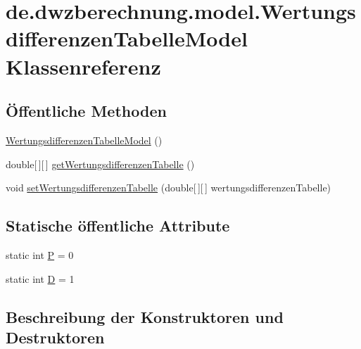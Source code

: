\hypertarget{classde_1_1dwzberechnung_1_1model_1_1_wertungsdifferenzen_tabelle_model}{}\section{de.\+dwzberechnung.\+model.\+Wertungsdifferenzen\+Tabelle\+Model Klassenreferenz}
\label{classde_1_1dwzberechnung_1_1model_1_1_wertungsdifferenzen_tabelle_model}
\subsection*{Öffentliche Methoden}
\begin{DoxyCompactItemize}
\item 
\hyperlink{classde_1_1dwzberechnung_1_1model_1_1_wertungsdifferenzen_tabelle_model_aaf102d0c950e40b46a0bf01a78148ccd}{Wertungsdifferenzen\+Tabelle\+Model} ()
\item 
double\mbox{[}$\,$\mbox{]}\mbox{[}$\,$\mbox{]} \hyperlink{classde_1_1dwzberechnung_1_1model_1_1_wertungsdifferenzen_tabelle_model_ad5c004849bc9221069bdee0840bcfc88}{get\+Wertungsdifferenzen\+Tabelle} ()
\item 
void \hyperlink{classde_1_1dwzberechnung_1_1model_1_1_wertungsdifferenzen_tabelle_model_ae74c99c5097c7b78553ca9d60cc1f675}{set\+Wertungsdifferenzen\+Tabelle} (double\mbox{[}$\,$\mbox{]}\mbox{[}$\,$\mbox{]} wertungsdifferenzen\+Tabelle)
\end{DoxyCompactItemize}
\subsection*{Statische öffentliche Attribute}
\begin{DoxyCompactItemize}
\item 
static int \hyperlink{classde_1_1dwzberechnung_1_1model_1_1_wertungsdifferenzen_tabelle_model_ae4f02583678bf96f2501282e7fb743cf}{P} = 0
\item 
static int \hyperlink{classde_1_1dwzberechnung_1_1model_1_1_wertungsdifferenzen_tabelle_model_a8025675bedd5c27d63f3958d6a7f680c}{D} = 1
\end{DoxyCompactItemize}


\subsection{Beschreibung der Konstruktoren und Destruktoren}
